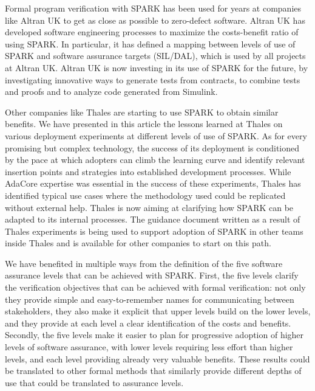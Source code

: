 \documentclass{llncs}
\begin{document}
Formal program verification with SPARK has been used for years at companies
like Altran UK to get as close as possible to zero-defect software. Altran UK
has developed software engineering processes to maximize the costs-benefit
ratio of using SPARK. In particular, it has defined a mapping between levels of
use of SPARK and software assurance targets (SIL/DAL), which is used by all
projects at Altran UK. Altran UK is now investing in its use of SPARK for the
future, by investigating innovative ways to generate tests from contracts, to
combine tests and proofs and to analyze code generated from Simulink.

Other companies like Thales are starting to use SPARK to obtain similar
benefits. We have presented in this article the lessons learned at Thales on
various deployment experiments at different levels of use of SPARK. As for
every promising but complex technology, the success of its deployment is
conditioned by the pace at which adopters can climb the learning curve and
identify relevant insertion points and strategies into established development
processes. While AdaCore expertise was essential in the success of these
experiments, Thales has identified typical use cases where the methodology used
could be replicated without external help. Thales is now aiming at clarifying
how SPARK can be adapted to its internal processes. The guidance document
written as a result of Thales experiments is being used to support adoption of
SPARK in other teams inside Thales and is available for other companies to
start on this path.

We have benefited in multiple ways from the definition of the five software
assurance levels that can be achieved with SPARK. First, the five levels
clarify the verification objectives that can be achieved with formal
verification: not only they provide simple and easy-to-remember names for
communicating between stakeholders, they also make it explicit that upper
levels build on the lower levels, and they provide at each level a clear
identification of the costs and benefits. Secondly, the five levels make it
easier to plan for progressive adoption of higher levels of software assurance,
with lower levels requiring less effort than higher levels, and each level
providing already very valuable benefits. These results could be translated to
other formal methods that similarly provide different depths of use that could
be translated to assurance levels.




\end{document}
